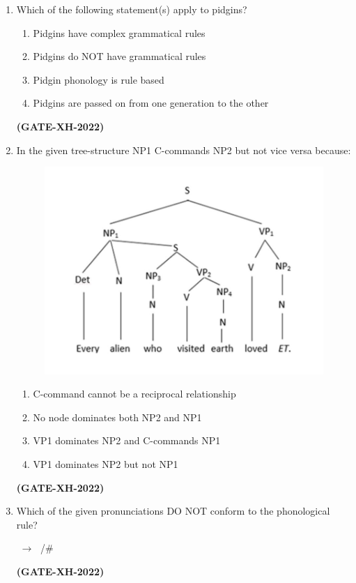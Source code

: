 \documentclass[journal]{IEEEtran}
\begin{document}
\begin{enumerate}
\item Which of the following statement(s) apply to pidgins?
\begin{enumerate}
\item Pidgins have complex grammatical rules
\item Pidgins do NOT have grammatical rules
\item Pidgin phonology is rule based
\item Pidgins are passed on from one generation to the other
\end{enumerate}
\hfill\textbf{(GATE-XH-2022)}

\item In the given tree-structure NP1 C-commands NP2 but not vice versa because:
\begin{figure}[h!]
    \centering
    \includegraphics[width=0.5\columnwidth]{figs/Q.119.jpeg}
    \label{Q.119}
\end{figure}
\newpage
\begin{enumerate}
\item C-command cannot be a reciprocal relationship
\item No node dominates both NP2 and NP1
\item VP1 dominates NP2 and C-commands NP1
\item VP1 dominates NP2 but not NP1
\end{enumerate}
\hfill\textbf{(GATE-XH-2022)}

\item Which of the given pronunciations DO NOT conform to the phonological rule?

 $\;\rightarrow\;$  /\underline{\hspace{0.7cm}}\#
\begin{enumerate}
\end{enumerate}
\hfill\textbf{(GATE-XH-2022)}

\end{enumerate}
\end{document}
